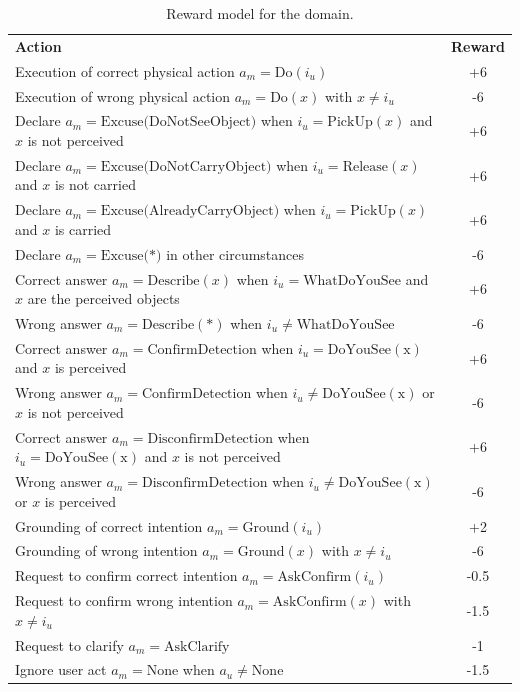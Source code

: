 \begin{table}[ht]
\begin{center}
\begin{footnotesize}
\begin{tabular}{p{130mm}c} 
\centering \textbf{Action} & \textbf{Reward} \\
Execution of correct physical action $a_m\!=\!\mathrm{Do}(i_u)$ & +6 \\
Execution of wrong physical action $a_m\!=\!\mathrm{Do}(x)$ with $x\!\neq\!i_u$ & -6  \\
Declare $a_m\!=\!\mathrm{Excuse(DoNotSeeObject})$ when $i_u\!=\!\mathrm{PickUp}(x)$ and $x$ is not perceived & +6 \\
Declare $a_m\!=\!\mathrm{Excuse(DoNotCarryObject})$ when $i_u\!=\!\mathrm{Release}(x)$ and $x$ is not carried & +6 \\
Declare $a_m\!=\!\mathrm{Excuse(AlreadyCarryObject})$ when $i_u\!=\!\mathrm{PickUp}(x)$ and $x$ is carried & +6 \\
Declare $a_m\!=\!\mathrm{Excuse(*})$ in other circumstances & -6 \\
Correct answer $a_m\!=\!\mathrm{Describe}(x)$ when $i_u\!=\!\mathrm{WhatDoYouSee}$ and $x$ are the perceived objects & +6 \\
Wrong answer $a_m\!=\!\mathrm{Describe}(*)$ when $i_u\!\neq\!\mathrm{WhatDoYouSee}$ & -6 \\
Correct answer $a_m\!=\!\mathrm{ConfirmDetection}$ when $i_u\!=\!\mathrm{DoYouSee(x)}$ and $x$ is perceived & +6 \\
Wrong answer $a_m\!=\!\mathrm{ConfirmDetection}$ when $i_u\!\neq\!\mathrm{DoYouSee(x)}$ or $x$ is not perceived & -6 \\
Correct answer $a_m\!=\!\mathrm{DisconfirmDetection}$ when $i_u\!=\!\mathrm{DoYouSee(x)}$ and $x$ is not perceived & +6 \\
Wrong answer $a_m\!=\!\mathrm{DisconfirmDetection}$ when $i_u\!\neq\!\mathrm{DoYouSee(x)}$ or $x$ is perceived & -6 \\
Grounding of correct intention $a_m\!=\!\mathrm{Ground}(i_u)$ & +2 \\
Grounding of wrong intention  $a_m\!=\!\mathrm{Ground}(x)$ with $x\!\neq\!i_u$ & -6  \\ 
Request to confirm correct intention $a_m\!=\!\mathrm{AskConfirm}(i_u)$ & -0.5 \\
Request to confirm wrong intention  $a_m\!=\!\mathrm{AskConfirm}(x)$ with $x\!\neq\!i_u$ & -1.5  \\ 
Request to clarify $a_m\!=\!\mathrm{AskClarify}$ & -1 \\
Ignore user act $a_m\!=\!\mathrm{None}$ when $a_u\!\neq\!\mathrm{None}$ & -1.5 
\end{tabular}
\end{footnotesize}
\end{center}  
\caption{Reward model for the domain.} 
\label{table:rewards}
\end{table}


